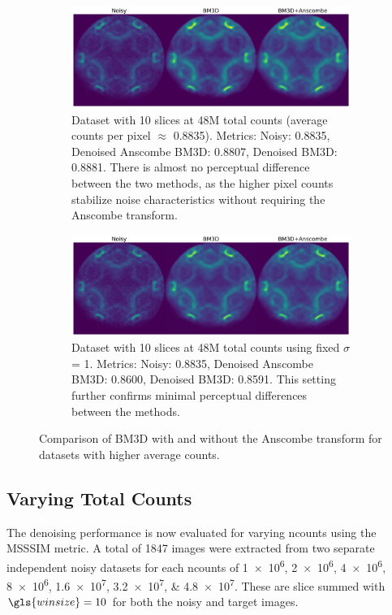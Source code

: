 \begin{figure}
    \centering
    \begin{subfigure}[b]{1\linewidth}
        \centering
        \includegraphics[width=1\linewidth]{images/noisy_denoised_bm3d_anscombe_48M_10slices_sigma_1.pdf}
        \caption{Dataset with 10 slices at 48M total counts (average counts per pixel $\approx$ 0.8835). Metrics: Noisy: 0.8835, Denoised Anscombe BM3D: 0.8807, Denoised BM3D: 0.8881. There is almost no perceptual difference between the two methods, as the higher pixel counts stabilize noise characteristics without requiring the Anscombe transform.}
        \label{}
    \end{subfigure}
    \begin{subfigure}[b]{1\linewidth}
        \centering
        \includegraphics[width=1\linewidth]{images/noisy_denoised_bm3d_anscombe_48M_10slices_optimal_sigma.pdf}
        \caption{Dataset with 10 slices at 48M total counts using fixed $\sigma$ = 1. Metrics: Noisy: 0.8835, Denoised Anscombe BM3D: 0.8600, Denoised BM3D: 0.8591. This setting further confirms minimal perceptual differences between the methods.}
    \end{subfigure}
    \caption{Comparison of BM3D with and without the Anscombe transform for datasets with higher average counts.}
    \label{}
\end{figure}


\subsection{Varying Total Counts}
The denoising performance is now evaluated for varying \gls{ncounts} using the \gls{MSSSIM} metric. A total of \num{1847} images  were extracted from two separate independent noisy datasets for each \gls{ncounts} of \numlist{1e6;2e6;4e6;8e6;1.6e7;3.2e7;4.8e7}. These are slice summed with $\gls{winsize}=10$ for both the noisy and target images. 

